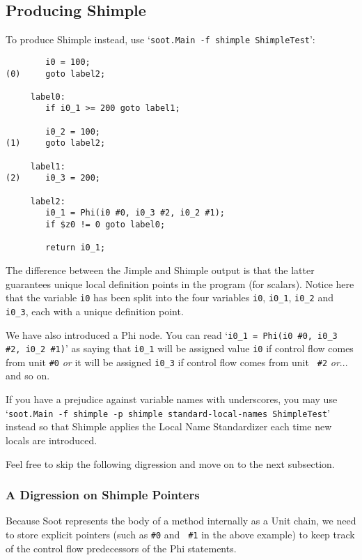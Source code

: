 \documentclass[10pt,letterpaper,oneside,onecolumn]{article}
\begin{document}
\subsection{Producing Shimple}

To produce Shimple instead, use `{\tt soot.Main -f shimple ShimpleTest}':

\begin{verbatim}
        i0 = 100;
(0)     goto label2;

     label0:
        if i0_1 >= 200 goto label1;

        i0_2 = 100;
(1)     goto label2;

     label1:
(2)     i0_3 = 200;

     label2:
        i0_1 = Phi(i0 #0, i0_3 #2, i0_2 #1);
        if $z0 != 0 goto label0;

        return i0_1;
\end{verbatim}

The difference between the Jimple and Shimple output is that the
latter guarantees unique local definition points in the program (for
scalars).  Notice here that the variable {\tt i0} has been split into
the four variables {\tt i0}, {\tt i0\_1}, {\tt i0\_2} and {\tt i0\_3},
each with a unique definition point.

We have also introduced a Phi node.  You can read `{\tt i0\_1 = Phi(i0
\#0, i0\_3 \#2, i0\_2 \#1)}' as saying that {\tt i0\_1} will be assigned
value {\tt i0} if control flow comes from unit {\tt \#0} {\em or} it
will be assigned {\tt i0\_3} if control flow comes from unit {\tt
\#2} {\em or}... and so on.

If you have a prejudice against variable names with underscores, you
may use `{\tt soot.Main -f shimple -p shimple standard-local-names
ShimpleTest}' instead so that Shimple applies the Local Name
Standardizer each time new locals are introduced.

Feel free to skip the following digression and move on to the next
subsection.

\subsubsection{A Digression on Shimple Pointers}

Because Soot represents the body of a method internally as a Unit
chain, we need to store explicit pointers (such as {\tt \#0} and {\tt
\#1} in the above example) to keep track of the control flow
predecessors of the Phi statements.
\end{document}
